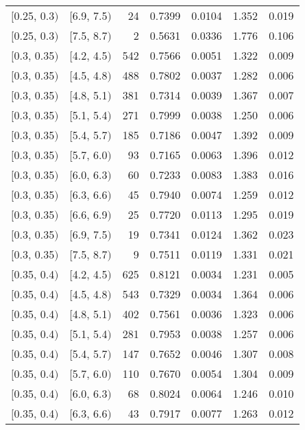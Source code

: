 \begin{longtable}{| l | l | r | r | r | r | r |}
        $[$0.25, 0.3$)$ & $[$6.9, 7.5$)$ & 24  & 0.7399 & 0.0104 & 1.352 & 0.019 \\
        $[$0.25, 0.3$)$ & $[$7.5, 8.7$)$ & 2   & 0.5631 & 0.0336 & 1.776 & 0.106 \\
        $[$0.3, 0.35$)$ & $[$4.2, 4.5$)$ & 542 & 0.7566 & 0.0051 & 1.322 & 0.009 \\
        $[$0.3, 0.35$)$ & $[$4.5, 4.8$)$ & 488 & 0.7802 & 0.0037 & 1.282 & 0.006 \\
        $[$0.3, 0.35$)$ & $[$4.8, 5.1$)$ & 381 & 0.7314 & 0.0039 & 1.367 & 0.007 \\
        $[$0.3, 0.35$)$ & $[$5.1, 5.4$)$ & 271 & 0.7999 & 0.0038 & 1.250 & 0.006 \\
        $[$0.3, 0.35$)$ & $[$5.4, 5.7$)$ & 185 & 0.7186 & 0.0047 & 1.392 & 0.009 \\
        $[$0.3, 0.35$)$ & $[$5.7, 6.0$)$ & 93  & 0.7165 & 0.0063 & 1.396 & 0.012 \\
        $[$0.3, 0.35$)$ & $[$6.0, 6.3$)$ & 60  & 0.7233 & 0.0083 & 1.383 & 0.016 \\
        $[$0.3, 0.35$)$ & $[$6.3, 6.6$)$ & 45  & 0.7940 & 0.0074 & 1.259 & 0.012 \\
        $[$0.3, 0.35$)$ & $[$6.6, 6.9$)$ & 25  & 0.7720 & 0.0113 & 1.295 & 0.019 \\
        $[$0.3, 0.35$)$ & $[$6.9, 7.5$)$ & 19  & 0.7341 & 0.0124 & 1.362 & 0.023 \\
        $[$0.3, 0.35$)$ & $[$7.5, 8.7$)$ & 9   & 0.7511 & 0.0119 & 1.331 & 0.021 \\
        $[$0.35, 0.4$)$ & $[$4.2, 4.5$)$ & 625 & 0.8121 & 0.0034 & 1.231 & 0.005 \\
        $[$0.35, 0.4$)$ & $[$4.5, 4.8$)$ & 543 & 0.7329 & 0.0034 & 1.364 & 0.006 \\
        $[$0.35, 0.4$)$ & $[$4.8, 5.1$)$ & 402 & 0.7561 & 0.0036 & 1.323 & 0.006 \\
        $[$0.35, 0.4$)$ & $[$5.1, 5.4$)$ & 281 & 0.7953 & 0.0038 & 1.257 & 0.006 \\
        $[$0.35, 0.4$)$ & $[$5.4, 5.7$)$ & 147 & 0.7652 & 0.0046 & 1.307 & 0.008 \\
        $[$0.35, 0.4$)$ & $[$5.7, 6.0$)$ & 110 & 0.7670 & 0.0054 & 1.304 & 0.009 \\
        $[$0.35, 0.4$)$ & $[$6.0, 6.3$)$ & 68  & 0.8024 & 0.0064 & 1.246 & 0.010 \\
        $[$0.35, 0.4$)$ & $[$6.3, 6.6$)$ & 43  & 0.7917 & 0.0077 & 1.263 & 0.012 \\

\end{longtable}
